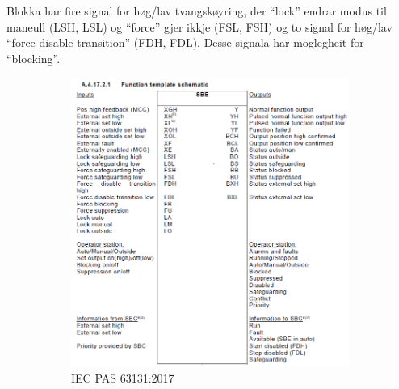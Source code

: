 Blokka har fire signal for høg/lav tvangskøyring, der ``lock'' endrar modus til maneull (LSH, LSL) og ``force'' gjer ikkje (FSL, FSH)
og to signal for høg/lav ``force disable transition'' (FDH, FDL). \newline
Desse signala har moglegheit for ``blocking''.

\newpage

\begin{figure}[htbp]
    \centering
    \begin{subfigure}[b]{0.46\textwidth}
        \centering
        \includegraphics[width=1\textwidth]{Bilder/SBEBlokkIEC.png}
        \caption{\gls{IEC} \gls{PAS} 63131:2017 \citep{SBE}}\label{fig:Switch Binary Electrical blokk IEC}
    \end{subfigure}
    \hfill
    \begin{subfigure}[b]{0.46\textwidth}
        \centering

\end{subfigure}
\end{figure}
